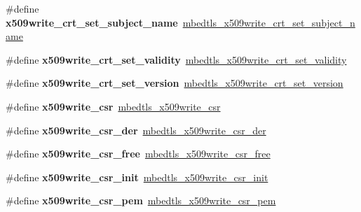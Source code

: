 \begin{DoxyCompactItemize}
\#define {\bfseries x509write\+\_\+crt\+\_\+set\+\_\+subject\+\_\+name}~\mbox{\hyperlink{x509__crt_8h_a272798b488a8ad984c4db95142392ba6}{mbedtls\+\_\+x509write\+\_\+crt\+\_\+set\+\_\+subject\+\_\+name}}
\item 
\mbox{\label{compat-1_83_8h_aa49bab4a6acc7a15b215d0f468aef2bd}} 
\#define {\bfseries x509write\+\_\+crt\+\_\+set\+\_\+validity}~\mbox{\hyperlink{x509__crt_8h_ac7f9ece75e647023a0411a7bfa72b9f1}{mbedtls\+\_\+x509write\+\_\+crt\+\_\+set\+\_\+validity}}
\item 
\mbox{\label{compat-1_83_8h_a195b0c9a2915f0d980bc821b83881af8}} 
\#define {\bfseries x509write\+\_\+crt\+\_\+set\+\_\+version}~\mbox{\hyperlink{x509__crt_8h_aa068b95987692787e169dc9d67677e57}{mbedtls\+\_\+x509write\+\_\+crt\+\_\+set\+\_\+version}}
\item 
\mbox{\label{compat-1_83_8h_a78b7b5bdae4efa5a1adab6b71bcab202}} 
\#define {\bfseries x509write\+\_\+csr}~\mbox{\hyperlink{structmbedtls__x509write__csr}{mbedtls\+\_\+x509write\+\_\+csr}}
\item 
\mbox{\label{compat-1_83_8h_aa33cd42906707836cf05b7f66ae02637}} 
\#define {\bfseries x509write\+\_\+csr\+\_\+der}~\mbox{\hyperlink{x509__csr_8h_ade066bfe50987c491ff51ce4f347fcb4}{mbedtls\+\_\+x509write\+\_\+csr\+\_\+der}}
\item 
\mbox{\label{compat-1_83_8h_aa9078026e55fb3da6af32586ee2a9e4f}} 
\#define {\bfseries x509write\+\_\+csr\+\_\+free}~\mbox{\hyperlink{x509__csr_8h_a223d765f33318e804739f9cf81eddef6}{mbedtls\+\_\+x509write\+\_\+csr\+\_\+free}}
\item 
\mbox{\label{compat-1_83_8h_a6ace4eb79d9bdd7f0abd1d8a427c600c}} 
\#define {\bfseries x509write\+\_\+csr\+\_\+init}~\mbox{\hyperlink{x509__csr_8h_a7892bce1ba95bfe909929f9b9c1362e8}{mbedtls\+\_\+x509write\+\_\+csr\+\_\+init}}
\item 
\mbox{\label{compat-1_83_8h_a33f32f2e81ab0ce8d8f1c10af191fad6}} 
\#define {\bfseries x509write\+\_\+csr\+\_\+pem}~\mbox{\hyperlink{x509__csr_8h_a5851f2aeb7d9a4676c16d2a837cad0cc}{mbedtls\+\_\+x509write\+\_\+csr\+\_\+pem}}
\item 
\mbox{\label{compat-1_83_8h_a9d9c6b65b91d8f274f82f2277143b1fe}} 

\end{DoxyCompactItemize}
